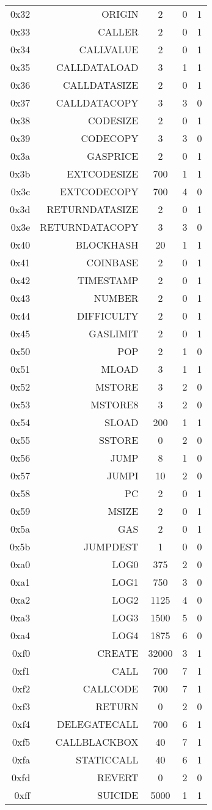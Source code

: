\documentclass[10pt,a4paper,oneside]{scrartcl}
\begin{document}
{\begin{longtable}{r r c l l}
0x32 & ORIGIN & 2 & 0 & 1 \\
0x33 & CALLER & 2 & 0 & 1 \\
0x34 & CALLVALUE & 2 & 0 & 1 \\
0x35 & CALLDATALOAD & 3 & 1 & 1 \\
0x36 & CALLDATASIZE & 2 & 0 & 1 \\
0x37 & CALLDATACOPY & 3 & 3 & 0 \\
0x38 & CODESIZE & 2 & 0 & 1 \\
0x39 & CODECOPY & 3 & 3 & 0 \\
0x3a & GASPRICE & 2 & 0 & 1 \\
0x3b & EXTCODESIZE & 700 & 1 & 1 \\
0x3c & EXTCODECOPY & 700 & 4 & 0 \\
0x3d & RETURNDATASIZE & 2 & 0 & 1 \\
0x3e & RETURNDATACOPY & 3 & 3 & 0 \\
0x40 & BLOCKHASH & 20 & 1 & 1 \\
0x41 & COINBASE & 2 & 0 & 1 \\
0x42 & TIMESTAMP & 2 & 0 & 1 \\
0x43 & NUMBER & 2  & 0 & 1 \\
0x44 & DIFFICULTY & 2 & 0 & 1 \\
0x45 & GASLIMIT & 2  & 0 & 1 \\
0x50 & POP & 2 & 1 & 0 \\
0x51 & MLOAD & 3 & 1 & 1 \\
0x52 & MSTORE & 3 & 2 & 0 \\
0x53 & MSTORE8 & 3 & 2 & 0 \\
0x54 & SLOAD & 200 & 1 & 1 \\
0x55 & SSTORE & 0 & 2 & 0 \\
0x56 & JUMP & 8 & 1 & 0 \\
0x57 & JUMPI & 10 & 2 & 0 \\
0x58 & PC & 2 & 0 & 1 \\
0x59 & MSIZE & 2 & 0 & 1 \\
0x5a & GAS & 2 & 0 & 1 \\
0x5b & JUMPDEST & 1 & 0 & 0 \\
0xa0 & LOG0 & 375 & 2 & 0 \\
0xa1 & LOG1 & 750 & 3 & 0 \\
0xa2 & LOG2 & 1125 & 4 & 0 \\
0xa3 & LOG3 & 1500 & 5 & 0 \\
0xa4 & LOG4 & 1875 & 6 & 0 \\
0xf0 & CREATE & 32000 & 3 & 1 \\
0xf1 & CALL & 700 & 7 & 1 \\
0xf2 & CALLCODE & 700 & 7 & 1 \\
0xf3 & RETURN & 0 & 2 & 0 \\
0xf4 & DELEGATECALL & 700 & 6 & 1 \\
0xf5 & CALLBLACKBOX & 40 & 7 & 1 \\
0xfa & STATICCALL & 40 & 6 & 1 \\
0xfd & REVERT & 0 & 2 & 0 \\
0xff & SUICIDE & 5000 & 1 & 1 \\
\end{longtable}
}
\printbibliography
\end{document}
